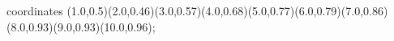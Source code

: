 					coordinates { (1.0,0.5)(2.0,0.46)(3.0,0.57)(4.0,0.68)(5.0,0.77)(6.0,0.79)(7.0,0.86)(8.0,0.93)(9.0,0.93)(10.0,0.96)};